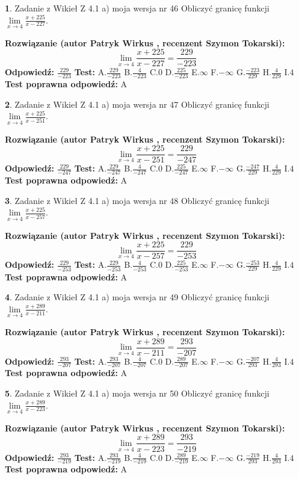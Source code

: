 \documentclass[12pt, a4paper]{article}
\theoremstyle{definition} %
\newtheorem{zad}{}
\newcommand{\zadStart}[1]{\begin{zad}#1\newline}
\newcommand{\zadStop}{\end{zad}}
\newcommand{\rozwStart}[2]{\noindent \textbf{Rozwiązanie (autor #1 , recenzent #2): }\newline}
\newcommand{\rozwStop}{\newline}
\newcommand{\odpStart}{\noindent \textbf{Odpowiedź:}\newline}
\newcommand{\odpStop}{\newline}
\newcommand{\testStart}{\noindent \textbf{Test:}\newline}
\newcommand{\testStop}{\newline}
\newcommand{\kluczStart}{\noindent \textbf{Test poprawna odpowiedź:}\newline}
\newcommand{\kluczStop}{\newline}
\begin{document}
\zadStart{Zadanie z Wikieł Z 4.1 a) moja wersja nr 46}
Obliczyć granicę funkcji $\lim\limits_{x\to4}\frac{x+225}{x-227}$.
\zadStop
\rozwStart{Patryk Wirkus}{Szymon Tokarski}
$$\lim\limits_{x\to4}\frac{x+225}{x-227} = \frac{229}{-223}$$
\rozwStop
\odpStart
$\frac{229}{-223}$
\odpStop
\testStart
A.$\frac{229}{-223}$
B.$\frac{4}{-223}$
C.$0$
D.$\frac{225}{-223}$
E.$\infty$
F.$-\infty$
G.$\frac{-223}{229}$
H.$\frac{4}{229}$
I.$4$
\testStop
\kluczStart
A
\kluczStop



\zadStart{Zadanie z Wikieł Z 4.1 a) moja wersja nr 47}
Obliczyć granicę funkcji $\lim\limits_{x\to4}\frac{x+225}{x-251}$.
\zadStop
\rozwStart{Patryk Wirkus}{Szymon Tokarski}
$$\lim\limits_{x\to4}\frac{x+225}{x-251} = \frac{229}{-247}$$
\rozwStop
\odpStart
$\frac{229}{-247}$
\odpStop
\testStart
A.$\frac{229}{-247}$
B.$\frac{4}{-247}$
C.$0$
D.$\frac{225}{-247}$
E.$\infty$
F.$-\infty$
G.$\frac{-247}{229}$
H.$\frac{4}{229}$
I.$4$
\testStop
\kluczStart
A
\kluczStop



\zadStart{Zadanie z Wikieł Z 4.1 a) moja wersja nr 48}
Obliczyć granicę funkcji $\lim\limits_{x\to4}\frac{x+225}{x-257}$.
\zadStop
\rozwStart{Patryk Wirkus}{Szymon Tokarski}
$$\lim\limits_{x\to4}\frac{x+225}{x-257} = \frac{229}{-253}$$
\rozwStop
\odpStart
$\frac{229}{-253}$
\odpStop
\testStart
A.$\frac{229}{-253}$
B.$\frac{4}{-253}$
C.$0$
D.$\frac{225}{-253}$
E.$\infty$
F.$-\infty$
G.$\frac{-253}{229}$
H.$\frac{4}{229}$
I.$4$
\testStop
\kluczStart
A
\kluczStop



\zadStart{Zadanie z Wikieł Z 4.1 a) moja wersja nr 49}
Obliczyć granicę funkcji $\lim\limits_{x\to4}\frac{x+289}{x-211}$.
\zadStop
\rozwStart{Patryk Wirkus}{Szymon Tokarski}
$$\lim\limits_{x\to4}\frac{x+289}{x-211} = \frac{293}{-207}$$
\rozwStop
\odpStart
$\frac{293}{-207}$
\odpStop
\testStart
A.$\frac{293}{-207}$
B.$\frac{4}{-207}$
C.$0$
D.$\frac{289}{-207}$
E.$\infty$
F.$-\infty$
G.$\frac{-207}{293}$
H.$\frac{4}{293}$
I.$4$
\testStop
\kluczStart
A
\kluczStop



\zadStart{Zadanie z Wikieł Z 4.1 a) moja wersja nr 50}
Obliczyć granicę funkcji $\lim\limits_{x\to4}\frac{x+289}{x-223}$.
\zadStop
\rozwStart{Patryk Wirkus}{Szymon Tokarski}
$$\lim\limits_{x\to4}\frac{x+289}{x-223} = \frac{293}{-219}$$
\rozwStop
\odpStart
$\frac{293}{-219}$
\odpStop
\testStart
A.$\frac{293}{-219}$
B.$\frac{4}{-219}$
C.$0$
D.$\frac{289}{-219}$
E.$\infty$
F.$-\infty$
G.$\frac{-219}{293}$
H.$\frac{4}{293}$
I.$4$
\testStop
\kluczStart
A
\kluczStop
\end{document}
